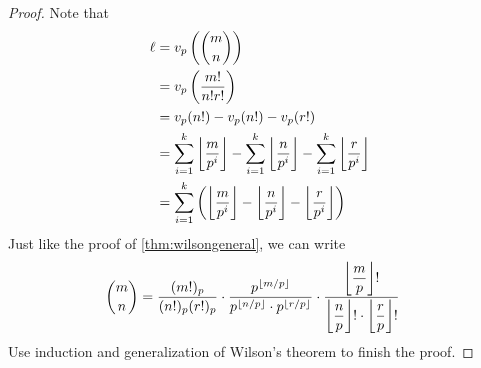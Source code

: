 	\begin{proof}
		Note that
			\begin{align*}
				\ell
					&= v_{p}\left(\binom{m}{n}\right)\\
					& = v_{p}\left(\frac{m!}{n!r!}\right)\\
					& = v_p(n!)-v_p(n!)-v_p(r!)\\
					& =\sum_{i=1}^{k}\left\lfloor{\dfrac{m}{p^i}}\right\rfloor- \sum_{i=1}^{k}\left\lfloor{\dfrac{n}{p^i}}\right\rfloor-\sum_{i=1}^{k}\left\lfloor{\dfrac{r}{p^i}}\right\rfloor\\
					&=\sum_{i=1}^{k}\left(\left\lfloor{\dfrac{m}{p^i}}\right\rfloor- \left\lfloor{\dfrac{n}{p^i}}\right\rfloor- \left\lfloor{\dfrac{r}{p^i}}\right\rfloor\right)
			\end{align*}
		Just like the proof of \autoref{thm:wilsongeneral}, we can write
			\begin{align*}
				\binom {m}{n}
					& =\frac{(m!)_p}{(n!)_p (r!)_p}\cdot
				\frac{p^{\left\lfloor{m/p}\right\rfloor}}{p^{\left\lfloor{n/p}\right\rfloor} \cdot p^{\left\lfloor{r/p}\right\rfloor}}\cdot
				\frac{\left\lfloor{\dfrac{m}{p}}\right\rfloor!}{\left\lfloor{\dfrac{n}{p}}\right\rfloor! \cdot \left\lfloor{\dfrac{r}{p}}\right\rfloor!}
			\end{align*}
		Use induction and generalization of Wilson's theorem to finish the proof.
	\end{proof}